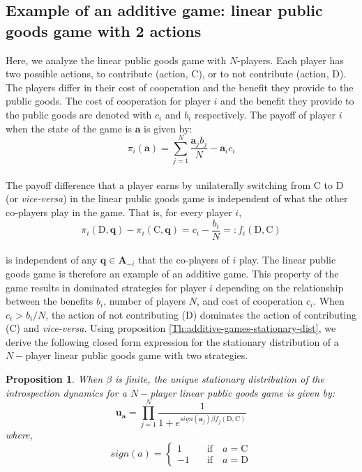 \documentclass[11pt]{article}
\theoremstyle{plainCl1}
\newtheorem{Prop}{Proposition}
\theoremstyle{plainCl2}
\newcommand{\A}{\mathbf{A}}
\newcommand{\abf}{\mathbf{a}}
\newcommand{\qbf}{\mathbf{q}}
\newcommand{\ubf}{\mathbf{u}}
\newcommand{\C}{\mathrm{C}}
\newcommand{\D}{\mathrm{D}}
\begin{document}
\subsection*{Example of an additive game: linear public goods game with 2 actions}
Here, we analyze the linear public goods game with $N$-players. Each player has two possible actions, to contribute (action, $\C$), or to not contribute (action, $\D$). The players differ in their cost of cooperation and the benefit they provide to the public goods. The cost of cooperation for player $i$ and the benefit they provide to the public goods are denoted with $c_i$ and $b_i$ respectively. The payoff of player $i$ when the state of the game is $\abf$ is given by: \\
\begin{equation}
\pi_i(\abf) = \sum_{j=1}^N \frac{\displaystyle \abf_j b_j}{N} - \abf_i c_i
\label{Eq:linear-pgg-payoff}
\end{equation}
\\
\noindent The payoff difference that a player earns by unilaterally switching from $\C$ to $\D$ (or \emph{vice-versa}) in the linear public goods game is independent of what the other co-players play in the game. That is, for every player $i$,
\begin{equation}
\pi_i(\D, \qbf) - \pi_i(\C, \qbf) = c_i - \frac{b_i}{N} =: f_i(\D, \C) 
\label{Eq:difference-payoffs-lpgg}
\end{equation}\\
\noindent is independent of any $\qbf \in \A_{-i}$ that the co-players of $i$ play. The linear public goods game is therefore an example of an additive game. This property of the game results in dominated strategies for player $i$ depending on the relationship between the benefits $b_i$, number of players $N$, and cost of cooperation $c_i$. When $c_i > b_i/N$, the action of not contributing ($\D$) dominates the action of contributing ($\C$) and \emph{vice-versa}. Using proposition \ref{Th:additive-games-stationary-dist}, we derive the following closed form expression for the stationary distribution of a $N-$player linear public goods game with two strategies. 
\begin{Prop}
\label{prop:stationary-dist-lpgg}
When $\beta$ is finite, the unique stationary distribution of the introspection dynamics for a $N-$player linear public goods game is given by: 
\\
\begin{equation}
\ubf_\abf = \prod_{j = 1}^{N} \frac{1}{1 + \displaystyle e^{\mathit{sign}(\abf_j)\beta f_j(\D, \C )}} 
\label{Eq:stationary_dist_lpgg}
\end{equation}
where, 
\begin{equation}
\label{Eq:sign-function}
\mathit{sign}(a) =
\begin{cases}
1 &\quad \text{if} \quad a = \C \\
-1 &\quad \text{if} \quad a = \D
\end{cases}
\end{equation}
\end{Prop}
\newpage
\end{document}
